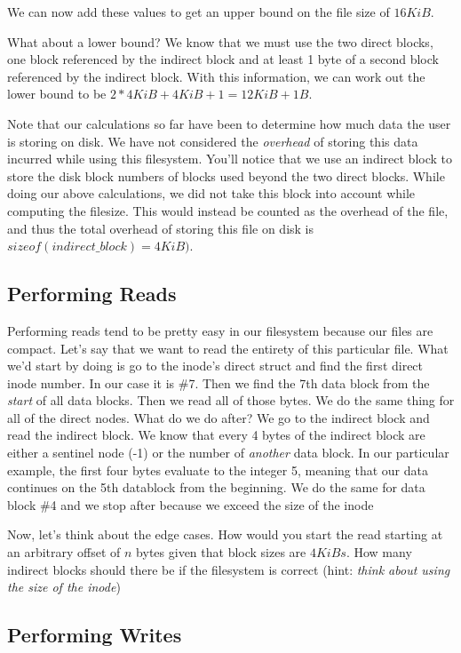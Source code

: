 We can now add these values to get an upper bound on the file size of $16KiB$.

What about a lower bound? We know that we must use the two direct blocks, one block referenced by the indirect block and at least 1 byte of a
second block referenced by the indirect block. With this information, we can work out the lower bound to be $2*4KiB+4KiB+1=12KiB+1B$.

Note that our calculations so far have been to determine how much data the user is storing on disk. We have not
considered the \textit{overhead} of storing this data incurred while using this filesystem. You'll notice that we use an
indirect block to store the disk block numbers of blocks used beyond the two direct blocks. While doing our above
calculations, we did not take this block into account while computing the filesize. This would instead be counted as the
overhead of the file, and thus the total overhead of storing this file on disk is $sizeof(indirect\_block)=4KiB)$.

\subsection{Performing Reads}

Performing reads tend to be pretty easy in our filesystem because our files are compact. Let's say that we want to read
the entirety of this particular file. What we'd start by doing is go to the inode's direct struct and find the first
direct inode number. In our case it is \#7. Then we find the 7th data block from the \textit{start} of all data blocks.
Then we read all of those bytes.
We do the same thing for all of the direct nodes. What do we do after? We go to the indirect block and read the
indirect block. We know that every 4 bytes of the indirect block are either a sentinel node (-1) or the number of
\textit{another} data block. In our particular example, the first four bytes evaluate to the integer 5, meaning that
our data continues on the 5th datablock from the beginning. We do the same for data block \#4 and we stop after because
we exceed the size of the inode

Now, let's think about the edge cases.
How would you start the read starting at an arbitrary offset of $n$ bytes given that block sizes are $4 KiBs$.
How many indirect blocks should there be if the filesystem is correct (hint: \textit{think about using the size of the inode})

\subsection{Performing Writes}

